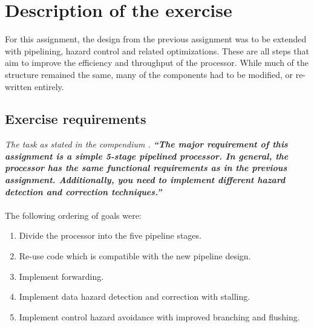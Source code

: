 \section{Description of the exercise}

For this assignment, the design from the previous assignment was to be extended
with pipelining, hazard control and related optimizations. These are all steps
that aim to improve the efficiency and throughput of the processor. While much
of the structure remained the same, many of the components had to be modified,
or re-written entirely.

\subsection{Exercise requirements}
\emph{The task as stated in the compendium \cite{compendium}.}\newline
\textbf{\emph{``The major requirement of this assignment is a simple 5-stage
pipelined processor. In general, the processor has the same functional
requirements as in the previous assignment. Additionally, you need to implement
different hazard detection and correction techniques.''}}
\paragraph*{}
The following ordering of goals were:
\begin{enumerate}
	\item Divide the processor into the five pipeline stages.
	\item Re-use code which is compatible with the new pipeline design.
	\item Implement forwarding.
	\item Implement data hazard detection and correction with stalling.
	\item Implement control hazard avoidance with improved branching and
flushing.
\end{enumerate}
